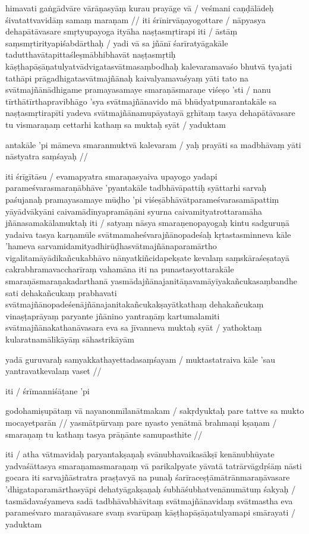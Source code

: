 himavati gaṅgādvāre vārāṇasyāṃ kurau prayāge vā  /
veśmani caṇḍālādeḥ śivatattvavidāṃ samaṃ maraṇam  //
iti śrīnirvāṇayogottare  / nāpyasya dehapātāvasare smṛtyupayoga ityāha naṣṭasmṛtirapi iti  / āstāṃ saṃsmṛtirityapiśabdārthaḥ  / yadi vā sa jñānī śarīratyāgakāle tadutthavātapittaśleṣmābhibhavāt naṣṭasmṛtiḥ kāṣṭhapāṣāṇatulyatvādvigatasvātmasaṃbodhaḥ kalevaramavaśo bhutvā tyajati tathāpi prāgadhigatasvātmajñānaḥ kaivalyamavaśyaṃ yāti tato na svātmajñānādhigame pramayasamaye smaraṇāsmaraṇe viśeṣo 'sti  / nanu tīrthātīrthapravibhāgo 'sya svātmajñānavido mā bhūdyatpunarantakāle sa naṣṭasmṛtirapīti yadeva svātmajñānamupāyatayā gṛhītaṃ tasya dehapātāvasare tu vismaraṇaṃ cettarhi kathaṃ sa muktaḥ syāt  / yaduktam

antakāle 'pi māmeva smaranmuktvā kalevaram  /
yaḥ prayāti sa madbhāvaṃ yāti nāstyatra saṃśayaḥ  //

iti śrīgītāsu  / evamapyatra smaraṇasyaiva upayogo yadapi parameśvarasmaraṇābhāve 'pyantakāle tadbhāvāpattiḥ syāttarhi sarvaḥ paśujanaḥ pramayasamaye mūḍho 'pi viśeṣābhāvātparameśvarasamāpattiṃ yāyādvākyāni caivamādīnyapramāṇāni syurna caivamityatrottaramāha jñānasamakālamuktaḥ iti  / satyaṃ nāsya smaraṇenopayogaḥ kintu sadguruṇā yadaiva tasya karṇamūle svātmamaheśvarajñānopadeśaḥ kṛtastasminneva kāle 'hameva sarvamidamityadhirūḍhasvātmajñānaparamārtho vigalitamāyādikañcukabhāvo nānyatkiñcidapekṣate kevalaṃ saṃskāraśeṣatayā cakrabhramavaccharīraṃ vahamāna iti na punastasyottarakāle smaraṇāsmaraṇakadarthanā yasmādajñānajanitāṇavamāyīyakañcukasaṃbandhe sati dehakañcukaṃ prabhavati svātmajñānopadeśenājñānajanitakañcukakṣayātkathaṃ dehakañcukaṃ vinaṣṭaprāyaṃ paryante jñānino yantraṇāṃ kartumalamiti svātmajñānakathanāvasara eva sa jīvanneva muktaḥ syāt  / yathoktaṃ kularatnamālikāyāṃ sāhastrikāyām

yadā guruvaraḥ samyakkathayettadasaṃśayam  /
muktastatraiva kāle 'sau yantravatkevalaṃ vaset  //

iti  / śrīmanniśāṭane 'pi

godohamiṣupātaṃ vā nayanonmīlanātmakam  /
sakṛdyuktaḥ pare tattve sa mukto mocayetparān  //
yasmātpūrvaṃ pare nyasto yenātmā brahmaṇi kṣaṇam  /
smaraṇaṃ tu kathaṃ tasya prāṇānte samupasthite  //

iti  / atha vātmavidaḥ paryantakṣaṇaḥ svānubhavaikasākṣī kenānubhūyate yadvaśāttasya smaraṇamasmaraṇaṃ vā parikalpyate yāvatā tatrārvāgdṛśāṃ nāsti gocara iti sarvajñāstratra praṣṭavyā na punaḥ śarīraceṣṭāmātrānmaraṇāvasare 'dhigataparamārthasyāpi dehatyāgakṣaṇaḥ śubhāśubhatvenānumātuṃ śakyaḥ  / tasmādavaśyameva sadā tadbhāvabhāvitaṃ svātmajñānavidaṃ svātmastha eva parameśvaro maraṇāvasare svaṃ svarūpaṃ kāṣṭhapāṣāṇatulyamapi smārayati  / yaduktam

